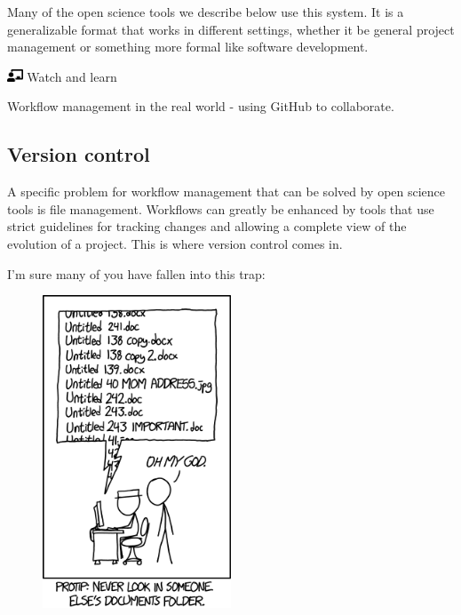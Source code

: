\documentclass[
  letterpaper,
  DIV=11,
  numbers=noendperiod]{scrreprt}
\begin{document}
Many of the open science tools we describe below use this system. It is
a generalizable format that works in different settings, whether it be
general project management or something more formal like software
development.

\includegraphics[width=1.25em,height=1em]{./collaborate_files/figure-pdf/fa-icon-5a0e5cd7bfbf585f8546c1ff4cebae73.pdf}
Watch and learn

Workflow management in the real world - using GitHub to collaborate.

\hypertarget{version-control}{%
\subsection{Version control}\label{version-control}}

A specific problem for workflow management that can be solved by open
science tools is file management. Workflows can greatly be enhanced by
tools that use strict guidelines for tracking changes and allowing a
complete view of the evolution of a project. This is where version
control comes in.

I'm sure many of you have fallen into this trap:

\begin{figure}

{\centering \includegraphics[width=0.5\textwidth,height=\textheight]{./img/filehell.png}

}

\end{figure}
\end{document}
